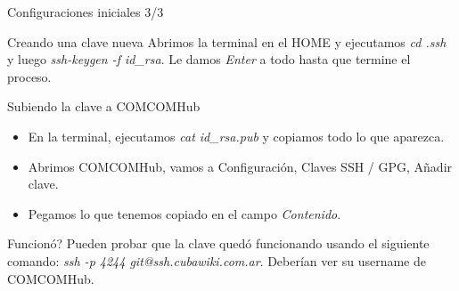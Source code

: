 \begin{frame}{Configuraciones iniciales 3/3}
  \begin{block}{Creando una clave nueva}
		Abrimos la terminal en el HOME y ejecutamos \textit{cd .ssh} y luego \textit{ssh-keygen -f id\_rsa}. Le damos \textit{Enter} a todo hasta que termine el proceso.
	\end{block}
  \pause
  \begin{block}{Subiendo la clave a COMCOMHub}
		\begin{itemize}
		\item En la terminal, ejecutamos \textit{cat id\_rsa.pub} y copiamos todo lo que aparezca.
      \item Abrimos COMCOMHub, vamos a Configuración, Claves SSH / GPG, Añadir clave.
      \item Pegamos lo que tenemos copiado en el campo \textit{Contenido}.
		\end{itemize}
	\end{block}
    \pause
    \begin{block}{Funcionó?}
        Pueden probar que la clave quedó funcionando usando el siguiente comando: \textit{ssh -p 4244 git@ssh.cubawiki.com.ar}. Deberían ver su username de COMCOMHub.
    \end{block}

\end{frame}
